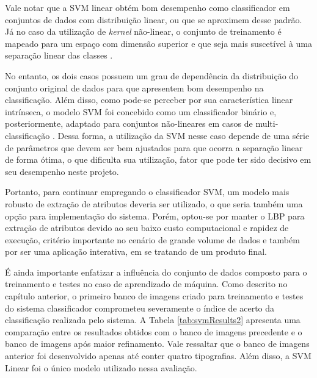 Vale notar que a SVM linear obtém bom desempenho como classificador em conjuntos de dados com distribuição linear, ou que se aproximem desse padrão. Já no caso da utilização de \textit{kernel} não-linear, o conjunto de treinamento é mapeado para um espaço com dimensão superior e que seja mais suscetível à uma separação linear das classes .

No entanto, os dois casos possuem um grau de dependência da distribuição do conjunto original de dados para que apresentem bom desempenho na classificação. Além disso, como pode-se perceber por sua característica linear intrínseca, o modelo SVM foi concebido como um classificador binário e, posteriormente, adaptado para conjuntos não-lineares em casos de multi-classificação . Dessa forma, a utilização da SVM nesse caso depende de uma série de parâmetros que devem ser bem ajustados para que ocorra a separação linear de forma ótima, o que dificulta sua utilização, fator que pode ter sido decisivo em seu desempenho neste projeto.

Portanto, para continuar empregando o classificador SVM, um modelo mais robusto de extração de atributos deveria ser utilizado, o que seria também uma opção para implementação do sistema. Porém, optou-se por manter o LBP para extração de atributos devido ao seu baixo custo computacional e rapidez de execução, critério importante no cenário de grande volume de dados e também por ser uma aplicação interativa, em se tratando de um produto final.



É ainda importante enfatizar a influência do conjunto de dados composto para o treinamento e testes no caso de aprendizado de máquina. Como descrito no capítulo anterior, o primeiro banco de imagens criado para treinamento e testes do sistema classificador comprometeu severamente o índice de acerto da classificação realizada pelo sistema. A Tabela \ref{tab:svmResults2} apresenta uma comparação entre os resultados obtidos com o banco de imagens precedente e o banco de imagens após maior refinamento. Vale ressaltar que o banco de imagens anterior foi desenvolvido apenas até conter quatro tipografias. Além disso, a SVM Linear foi o único modelo utilizado nessa avaliação.

